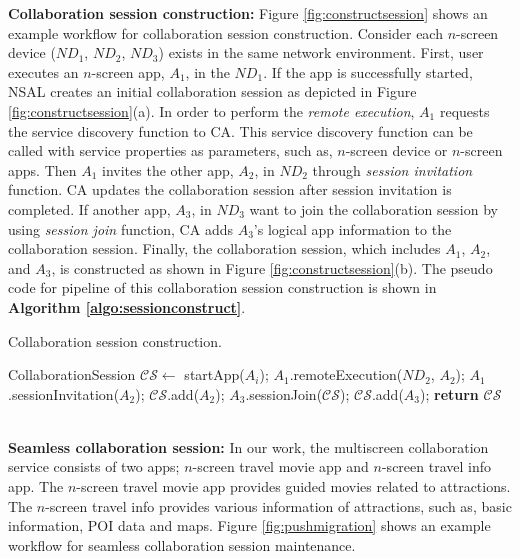 \documentclass{sig-alternate}
\begin{document}
\noindent
\textbf{Collaboration session construction:}  Figure \ref{fig:constructsession} shows an example workflow for collaboration session construction. Consider each $n$-screen device ($ND_1$, $ND_2$, $ND_3$)  exists in the same network environment. 
First, user executes an $n$-screen app, $A_1$, in the $ND_1$. If the app is successfully started, NSAL creates an initial collaboration session as depicted in Figure \ref{fig:constructsession}(a). In order to perform the \textit{remote execution}, $A_1$ requests the service discovery function to CA.  This service discovery function can be called with service properties as parameters, such as, $n$-screen device or $n$-screen apps. Then $A_1$ invites the other app, $A_2$, in $ND_2$ through \textit{session invitation} function. CA updates the collaboration session after session invitation is completed. If another app, $A_3$, in $ND_3$ want to join the collaboration session by using \textit{session join} function, CA adds $A_3$'s logical app information to the collaboration session. Finally, the collaboration session, which includes $A_1$, $A_2$, and $A_3$, is constructed as shown in Figure \ref{fig:constructsession}(b). 
The pseudo code for pipeline of this collaboration session construction is shown in \textbf{Algorithm \ref{algo:sessionconstruct}}.
    \begin{algorithm}
    \caption{Collaboration session construction.}
    \label{algo:sessionconstruct}
    \begin{algorithmic}[1]
       \State CollaborationSession $\mathcal{CS} \gets$ startApp($A_i$);
       \State $A_1$.remoteExecution($ND_2$, $A_2$);
       \State $A_1$.sessionInvitation($A_2$);
       \State $\mathcal{CS}$.add($A_2$);
       \State $A_3$.sessionJoin($\mathcal{CS}$);
       \State $\mathcal{CS}$.add($A_3$);
       \State \textbf{return} $\mathcal{CS}$
    \EndProcedure
    \end{algorithmic}
    \end{algorithm}
\\

\noindent
\textbf{Seamless collaboration session:}  
In our work, the multiscreen collaboration service consists of two apps; $n$-screen travel movie app and $n$-screen travel info app. 
The $n$-screen travel movie app provides guided movies related to attractions. 
The $n$-screen travel info provides various information of attractions, such as, basic information, POI data and maps.
Figure \ref{fig:pushmigration} shows an example workflow for seamless collaboration session maintenance. 
\end{document}
